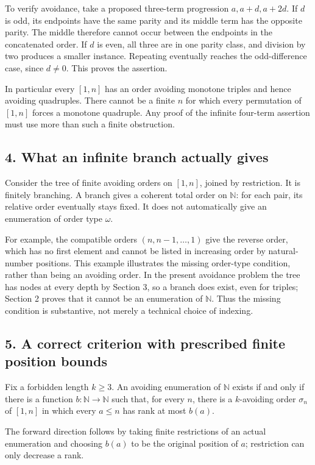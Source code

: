 To verify avoidance, take a proposed three-term progression $a,a+d,a+2d$. If $d$ is odd, its endpoints have the same parity and its middle term has the opposite parity. The middle therefore cannot occur between the endpoints in the concatenated order. If $d$ is even, all three are in one parity class, and division by two produces a smaller instance. Repeating eventually reaches the odd-difference case, since $d\ne0$. This proves the assertion.

In particular every $[1,n]$ has an order avoiding monotone triples and hence avoiding quadruples. There cannot be a finite $n$ for which every permutation of $[1,n]$ forces a monotone quadruple. Any proof of the infinite four-term assertion must use more than such a finite obstruction.

\subsection*{4. What an infinite branch actually gives}
Consider the tree of finite avoiding orders on $[1,n]$, joined by restriction. It is finitely branching. A branch gives a coherent total order on $\mathbb N$: for each pair, its relative order eventually stays fixed. It does not automatically give an enumeration of order type $\omega$.

For example, the compatible orders $(n,n-1,\ldots,1)$ give the reverse order, which has no first element and cannot be listed in increasing order by natural-number positions. This example illustrates the missing order-type condition, rather than being an avoiding order. In the present avoidance problem the tree has nodes at every depth by Section 3, so a branch does exist, even for triples; Section 2 proves that it cannot be an enumeration of $\mathbb N$. Thus the missing condition is substantive, not merely a technical choice of indexing.

\subsection*{5. A correct criterion with prescribed finite position bounds}
Fix a forbidden length $k\ge3$. An avoiding enumeration of $\mathbb N$ exists if and only if there is a function $b:\mathbb N\to\mathbb N$ such that, for every $n$, there is a $k$-avoiding order $\sigma_n$ of $[1,n]$ in which every $a\le n$ has rank at most $b(a)$.

The forward direction follows by taking finite restrictions of an actual enumeration and choosing $b(a)$ to be the original position of $a$; restriction can only decrease a rank.


